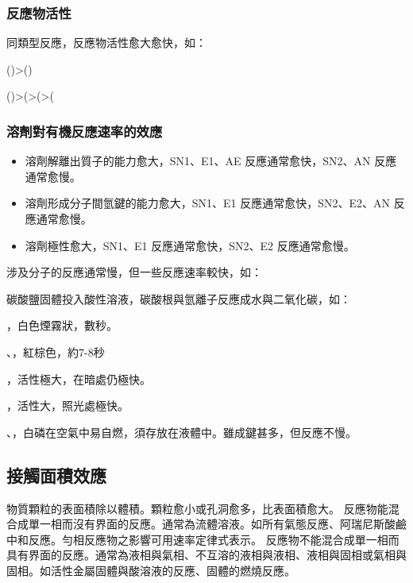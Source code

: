 \documentclass[a4paper,12pt]{report}
\begin{document}
\subsubsection{反應物活性}
同類型反應，反應物活性愈大愈快，如：
\bit
\item ()>()
\item ()>(>(>(
\eit
\subsubsection{溶劑對有機反應速率的效應}
\begin{itemize}
\item 溶劑解離出質子的能力愈大，SN1、E1、AE 反應通常愈快，SN2、AN 反應通常愈慢。
\item 溶劑形成分子間氫鍵的能力愈大，SN1、E1 反應通常愈快，SN2、E2、AN 反應通常愈慢。
\item 溶劑極性愈大，SN1、E1 反應通常愈快，SN2、E2 反應通常愈慢。
\end{itemize}
涉及分子的反應通常慢，但一些反應速率較快，如：
\bit
\item 碳酸鹽固體投入酸性溶液，碳酸根與氫離子反應成水與二氧化碳，如：
\item {}，白色煙霧狀，數秒。
\item {}、，紅棕色，約7-8秒
\item {}，活性極大，在暗處仍極快。
\item {}，活性大，照光處極快。
\item {}、，白磷在空氣中易自燃，須存放在液體中。雖成鍵甚多，但反應不慢。
\eit
\subsection{接觸面積效應}
物質顆粒的表面積除以體積。顆粒愈小或孔洞愈多，比表面積愈大。
反應物能混合成單一相而沒有界面的反應。通常為流體溶液。如所有氣態反應、阿瑞尼斯酸鹼中和反應。勻相反應物之影響可用速率定律式表示。
反應物不能混合成單一相而具有界面的反應。通常為液相與氣相、不互溶的液相與液相、液相與固相或氣相與固相。如活性金屬固體與酸溶液的反應、固體的燃燒反應。
\end{document}
